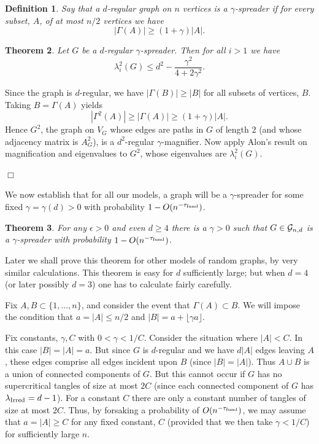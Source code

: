 \documentclass[12pt]{article}
\newtheorem{theorem}{Theorem}[section]
\newtheorem{definition}[theorem]{Definition}
\newcommand{\cg}{{\cal G}}
\newcommand{\cgnd}{\cg_{n,d}}
\newcommand{\fund}{{\rm fund}}
\newcommand{\taufund}{{\tau_\fund}}
\newcommand{\intn}{{\{1,\ldots,n\}}}
\newcommand{\proof}{{\par\noindent {\bf Proof}\space\space}}
\newcommand{\proofbox}{\begin{flushright}$\Box$\end{flushright}}
\newcommand{\ird}[1]{{\rm Irred}_{#1}}
\begin{document}
\begin{definition}
Say that a $d$-regular graph on $n$ vertices is a {\em $\gamma$-spreader}
if for every subset,
$A$, of at most $n/2$ vertices we have
$$
|\Gamma(A)|\ge (1+\gamma)|A|.
$$
\end{definition}
\begin{theorem}\label{th:separation}
Let $G$ be a $d$-regular $\gamma$-spreader.
Then for all $i>1$ we have 
$$
\lambda_i^2(G) \le d^2 -\frac{\gamma^2}{4+2\gamma^2}.
$$
\end{theorem}
\proof 
Since the graph is $d$-regular, we have $|\Gamma(B)|\ge |B|$ for all subsets
of vertices, $B$.  Taking $B=\Gamma(A)$ yields
$$
|\Gamma^2(A)|\ge |\Gamma(A)| \ge (1+\gamma)|A|.
$$
Hence $G^2$, the graph on $V_G$ whose edges are paths in $G$ of length $2$
(and whose adjacency matrix is $A_G^2$), is a $d^2$-regular $\gamma$-magnifier.
Now apply Alon's result on magnification and eigenvalues to $G^2$, whose
eigenvalues are $\lambda_i^2(G)$.
\proofbox

We now establish that for all our models, a graph will be a
$\gamma$-spreader for some fixed $\gamma=\gamma(d)>0$ with probability
$1-O(n^{-\taufund})$.

\begin{theorem}\label{th:magnify_cgnd}
For any $\epsilon>0$ and even $d\ge 4$ there is a $\gamma>0$
such that $G\in\cgnd$ is a $\gamma$-spreader
with probability
$1-O(n^{-\taufund})$.
\end{theorem}
Later we shall prove this theorem for other models of random graphs, by
very similar calculations.  This theorem is easy for $d$ sufficiently
large; but when $d=4$ (or later possibly $d=3$) one has to calculate
fairly carefully.
\proof 
Fix $A,B\subset\intn$, and consider the event that $\Gamma(A)\subset B$.
We will impose the condition that $a=|A|\le n/2$ and
$|B|=a+\lfloor \gamma a\rfloor$.

Fix constants, $\gamma,C$ with $0<\gamma<1/C$.  Consider the situation
where
$|A|<C$.  In this case
$|B|=|A|=a$.
But since $G$ is $d$-regular and we have $d|A|$ edges
leaving $A$,
these edges comprise all edges incident upon $B$ (since $|B|=|A|$).
Thus $A\cup B$ is a union of connected components of $G$.  But this
cannot occur if $G$ has no supercritical
tangles of size at most $2C$ (since each connected component of $G$ has
$\lambda_{\ird{}}=d-1$).  For a constant
$C$ there are only a constant number of tangles of size at most $2C$.
Thus, by forsaking a probability of $O(n^{-\taufund})$, we may assume
that $a=|A|\ge C$ for any fixed constant, $C$ (provided that we then
take $\gamma<1/C$) for sufficiently large $n$.
\end{document}
